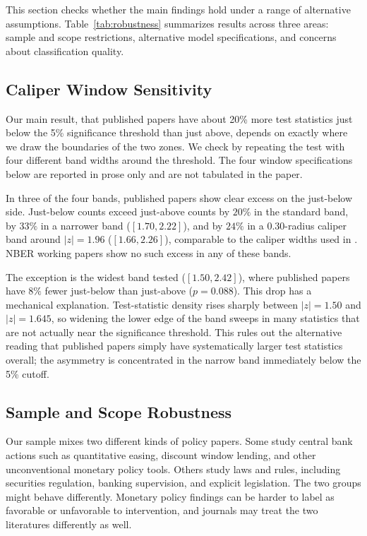 \documentclass[12pt]{article}
\begin{document}
This section checks whether the main findings hold under a range of
alternative assumptions.  Table~\ref{tab:robustness} summarizes results
across three areas: sample and scope restrictions, alternative model
specifications, and concerns about classification quality.

\subsection{Caliper Window Sensitivity}
\label{subsec:window_robustness}

Our main result, that published papers have about 20\% more test
statistics just below the 5\% significance threshold than just above,
depends on exactly where we draw the boundaries of the two zones.
We check by repeating the test with four different band widths around
the threshold.  The four window specifications below are reported in
prose only and are not tabulated in the paper.

In three of the four bands, published papers show clear excess on
the just-below side.  Just-below counts exceed just-above counts by
$20\%$ in the standard band, by $33\%$ in a narrower band
($[1.70,2.22]$), and by $24\%$ in a $0.30$-radius caliper band around
$|z|=1.96$ ($[1.66,2.26]$), comparable to the caliper widths used in
\citet*{Brodeur2016}.  NBER working papers show no such excess in any
of these bands.

The exception is the widest band tested ($[1.50,2.42]$), where
published papers have $8\%$ fewer just-below than just-above
($p = 0.088$).  This drop has a mechanical explanation.  Test-statistic
density rises sharply between $|z| = 1.50$ and $|z| = 1.645$, so
widening the lower edge of the band sweeps in many statistics that
are not actually near the significance threshold.  This rules out the
alternative reading that published papers simply have systematically
larger test statistics overall; the asymmetry is concentrated in the
narrow band immediately below the 5\% cutoff.

\subsection{Sample and Scope Robustness}

Our sample mixes two different kinds of policy papers.  Some study
central bank actions such as quantitative easing, discount window
lending, and other unconventional monetary policy tools.  Others study
laws and rules, including securities regulation, banking supervision,
and explicit legislation.  The two groups might behave differently.
Monetary policy findings can be harder to label as favorable or
unfavorable to intervention, and journals may treat the two
literatures differently as well.
\end{document}
